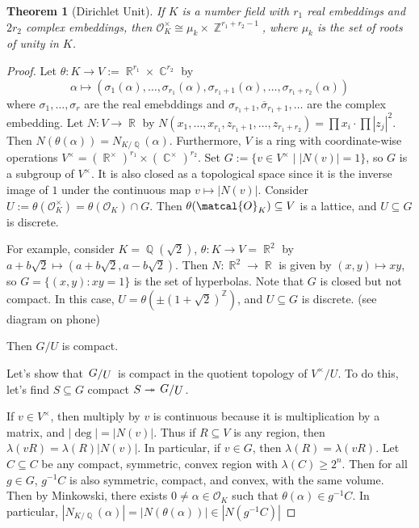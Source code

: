 \documentclass[11pt, a4paper]{memoir}
\DeclareMathOperator{\Q}{{\mathbb{Q}}}
\DeclareMathOperator{\Z}{{\mathbb{Z}}}
\DeclareMathOperator{\R}{{\mathbb{R}}}
\DeclareMathOperator{\C}{{\mathbb{C}}}
\newcommand{\abs}[1]{\ensuremath{\left\lvert#1\right\rvert}}
\theoremstyle{change}
\newtheorem{theorem}{Theorem}[section]
\theoremstyle{plain}
\theoremstyle{nonumberplain}
\newtheorem{proof}{Proof}
\newcommand{\quot}[2]{\mathchoice{\left.\raisebox{0.14em}{$#1$}\middle/\raisebox{-0.14em}{$#2$}\right.}
                                 {\left.\raisebox{0.08em}{$#1$}\middle/\raisebox{-0.08em}{$#2$}\right.}
                                 {\left.\raisebox{0.03em}{$#1$}\middle/\raisebox{-0.03em}{$#2$}\right.}
                                 {\left.\raisebox{0em}{$#1$}\middle/\raisebox{0em}{$#2$}\right.}}
\begin{document}
\begin{theorem}[Dirichlet Unit]
    If $K$ is a number field with $r_1$ real embeddings and $2r_2$ complex embeddings, then $\mathcal{O}_K^\times\cong\mu_k\times\Z^{r_1+r_2-1}$, where $\mu_k$ is the set of roots of unity in $K$.
\end{theorem}
\begin{proof}
    Let $\theta:K\to V:=\R^{r_1}\times\C^{r_2}$ by
    \begin{equation*}
        \alpha\mapsto(\sigma_1(\alpha),\ldots,\sigma_{r_1}(\alpha),\sigma_{r_1+1}(\alpha),\ldots,\sigma_{r_1+r_2}(\alpha))
    \end{equation*}
    where $\sigma_1,\ldots,\sigma_r$ are the real emebddings and $\sigma_{r_1+1},\overline{\sigma}_{r_1+1},\ldots$ are the complex embedding.
    Let $N:V\to\R$ by $N(x_1,\ldots,x_{r_1},z_{r_1+1},\ldots,z_{r_1+r_2})=\prod x_i\cdot\prod|z_j|^2$.
    Then $N(\theta(\alpha))=N_{K/\Q}(\alpha)$.
    Furthermore, $V$ is a ring with coordinate-wise operations $V^\times=(\R^\times)^{r_1}\times(\C^\times)^{r_2}$.
    Set $G:=\{v\in V^\times\mid|N(v)|=1\}$, so $G$ is a subgroup of $V^\times$.
    It is also closed as a topological space since it is the inverse image of $1$ under the continuous map $v\mapsto|N(v)|$.
    Consider $U:=\theta(\mathcal{O}_K^\times)=\theta(\mathcal{O}_K)\cap G$.
    Then $\theta(\matcal{O}_K)\subseteq V$ is a lattice, and $U\subseteq G$ is discrete.

    For example, consider $K=\Q(\sqrt{2})$, $\theta:K\to V=\R^2$ by $a+b\sqrt{2}\mapsto(a+b\sqrt{2},a-b\sqrt{2})$.
    Then $N:\R^2\to\R$ is given by $(x,y)\mapsto xy$, so $G=\{(x,y):xy=1\}$ is the set of hyperbolas.
    Note that $G$ is closed but not compact.
    In this case, $U=\theta(\pm(1+\sqrt{2})^{\Z})$, and $U\subseteq G$ is discrete.
    (see diagram on phone)
    \begin{center}
        \begin{tikzpicture}
        \end{tikzpicture}
    \end{center}
    Then $G/U$ is compact.

    Let's show that $\quot{G}{U}$ is compact in the quotient topology of $V^\times/U$.
    To do this, let's find $S\subseteq G$ compact $S\twoheadrightarrow\quot{G}{U}$.

    If $v\in V^\times$, then multiply by $v$ is continuous because it is multiplication by a matrix, and $|\deg|=|N(v)|$.
    Thus if $R\subseteq V$ is any region, then $\lambda(vR)=\lambda(R)|N(v)|$.
    In particular, if $v\in G$, then $\lambda(R)=\lambda(vR)$.
    Let $C\subseteq C$ be any compact, symmetric, convex region with $\lambda(C)\geq 2^n$.
    Then for all $g\in G$, $g^{-1}C$ is also symmetric, compact, and convex, with the same volume.
    Then by Minkowski, there exists $0\neq\alpha\in\mathcal{O}_K$ such that $\theta(\alpha)\in g^{-1}C$.
    In particular, $\abs{N_{K/\Q}(\alpha)}=\abs{N(\theta(\alpha))}\in\abs{N(g^{-1}C)}$


\end{proof}
\end{document}
